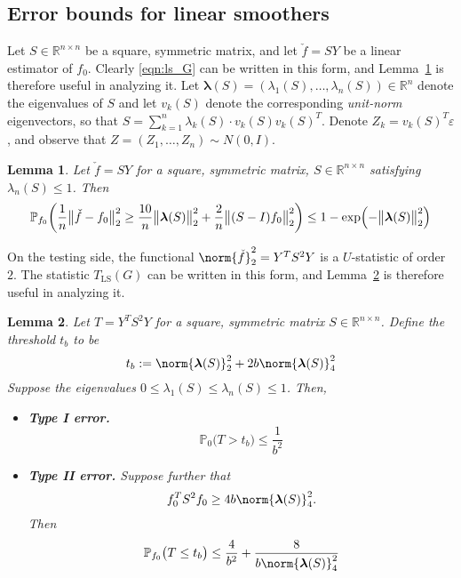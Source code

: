 \documentclass[twoside]{article}
\newcommand{\Reals}{\mathbb{R}}
\newcommand{\1}{\mathbf{1}}
\newcommand{\lambdavec}{\boldsymbol{\lambda}}
\newcommand{\Id}{I}
\newcommand{\Pbb}{\mathbb{P}}
\newcommand{\LS}{\mathrm{LS}}
\newtheorem{lemma}{Lemma}
\theoremstyle{definition}
\theoremstyle{remark}
\begin{document}
\subsection{Error bounds for linear smoothers}
Let $S \in \Reals^{n \times n}$ be a square, symmetric matrix, and let $\check{f} = SY$ be a linear estimator of $f_0$. Clearly \eqref{eqn:ls_G} can be written in this form, and Lemma~\ref{lem:linear_smoother_fixed_graph_estimation} is therefore useful in analyzing it. Let $\lambdavec(S) = (\lambda_1(S),\ldots,\lambda_n(S)) \in \Reals^n$ denote the eigenvalues of $S$ and let $v_k(S)$ denote the corresponding \emph{unit-norm} eigenvectors, so that $S = \sum_{k = 1}^{n} \lambda_k(S) \cdot v_k(S) v_k(S)^T$. Denote $Z_k = v_k(S)^T \varepsilon$, and observe that $Z = (Z_1,\ldots,Z_n) \sim N(0,\Id)$. 

\begin{lemma}
	\label{lem:linear_smoother_fixed_graph_estimation}
	Let $\check{f} = SY$ for a square, symmetric matrix, $S \in \Reals^{n \times n}$ satisfying $\lambda_n(S) \leq 1$. Then
	\begin{equation*}
	\Pbb_{f_0}\biggl(\frac{1}{n}\bigl\|\check{f} - f_0\bigr\|_2^2 \geq \frac{10}{n} \bigl\|\lambdavec(S)\bigr\|_2^2 + \frac{2}{n}\bigl\|(S - I)f_0\bigr\|_2^2\biggr) \leq 1 - \exp\Bigl(-\bigl\|\lambdavec(S)\bigr\|_2^2\Bigr)
	\end{equation*}
\end{lemma}

On the testing side, the functional $\norm{\check{f}}_2^2 = Y^T S^2 Y$ is a $U$-statistic of order $2$. The statistic $T_{\LS}(G)$ can be written in this form, and Lemma~\ref{lem:linear_smoother_fixed_graph_testing} is therefore useful in analyzing it.
\begin{lemma}
	\label{lem:linear_smoother_fixed_graph_testing}
	Let $T = Y^T S^2 Y$ for a square, symmetric matrix $S \in \Reals^{n \times n}$. Define the threshold $t_b$ to be 
	\begin{equation}
	t_{b} := \norm{\lambdavec(S)}_2^2 + 2b \norm{\lambdavec(S)}_4^2
	\end{equation}
	Suppose the eigenvalues $0 \leq \lambda_{1}(S) \leq \lambda_{n}(S) \leq 1$. Then,
	\begin{itemize}
		\item \textbf{Type I error.}
		\begin{equation}
		\label{eqn:linear_smoother_fixed_graph_testing_typeI}
		\Pbb_0\bigl(T > t_b\bigr) \leq \frac{1}{b^2}
		\end{equation}
		\item \textbf{Type II error.} Suppose further that
		\begin{equation}
		\label{eqn:linear_smoother_fixed_graph_testing_critical_radius}
		f_0^T S^2 f_0 \geq 4b \norm{\lambdavec(S)}_4^2.
		\end{equation}
		Then
		\begin{equation}
		\label{eqn:linear_smoother_fixed_graph_testing_typeII}
		\Pbb_{f_0}\bigl(T \leq t_b\bigr) \leq \frac{4}{b^2} + \frac{8}{b \norm{\lambdavec(S)}_4^{2}} 
		\end{equation}
	\end{itemize}
\end{lemma}
\end{document}
